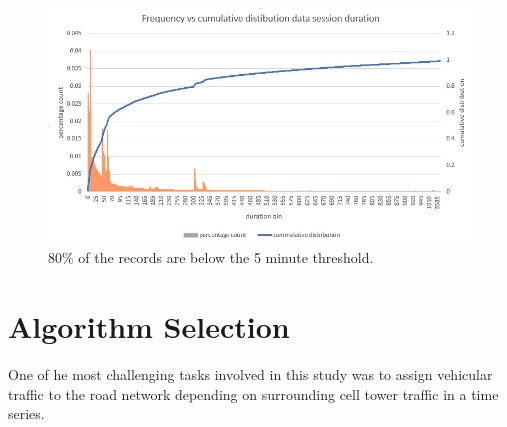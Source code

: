 \documentclass[12pt, a4paper]{report}
\theoremstyle{definition}
\theoremstyle{definition}%
\theoremstyle{definition}%
\theoremstyle{definition}%
\theoremstyle{definition}%
\theoremstyle{definition}%
\begin{document}
 
 
 \begin{figure}
 	\includegraphics[scale=0.75]{data_session_duration.jpg}
 	\centering
 	\caption{80\% of the records are below the 5 minute threshold.}
 	\label{fig:data_session_duration}
 \end{figure}
 






\section{Algorithm Selection} \label{section:methodology:algorithm_selection}

One of he most challenging tasks involved in this study was to assign vehicular traffic to the road network depending on surrounding cell tower traffic in a time series.
\end{document}
